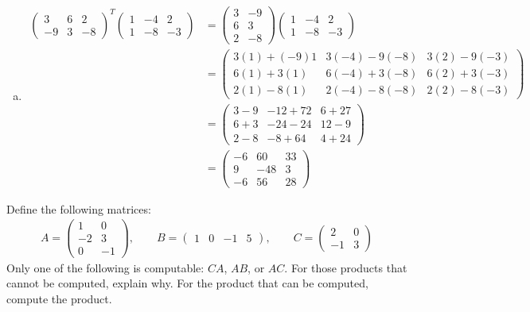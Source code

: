 \documentclass[11pt,letterpaper]{article}
\begin{document}
\begin{enumerate}[(a)]
\item 
	\[
	\begin{aligned}
	\begin{pmatrix} 3 & 6 & 2 \\ -9 & 3 & -8 \end{pmatrix}^T \begin{pmatrix} 1 & -4 & 2 \\ 1 & -8 & -3 \end{pmatrix}&= \begin{pmatrix} 3 & -9 \\ 6 & 3 \\ 2 & -8 \end{pmatrix} \begin{pmatrix} 1 & -4 & 2 \\ 1 & -8 & -3 \end{pmatrix} \\[0.3cm]
	&= \begin{pmatrix} 3(1) + (-9)1 & 3(-4) - 9(-8) & 3(2) - 9(-3) \\ 6(1) + 3(1) & 6(-4) + 3(-8) & 6(2) + 3(-3) \\ 2(1) - 8(1) & 2(-4) - 8(-8) & 2(2) - 8(-3) \end{pmatrix} \\[0.3cm]
	&= \begin{pmatrix} 3 - 9 & -12 + 72 & 6 + 27 \\ 6 + 3 & -24 - 24 & 12 - 9 \\ 2 - 8 & -8 + 64 & 4 + 24 \end{pmatrix} \\[0.3cm]
	&= \begin{pmatrix} -6 & 60 & 33 \\ 9 & -48 & 3 \\ -6 & 56 & 28 \end{pmatrix} 
	\end{aligned}
	\]
\end{enumerate}



\newpage



 Define the following matrices:
	\[
	\begin{aligned}
	A= \begin{pmatrix} 1 & 0 \\ -2 & 3 \\ 0 & -1 \end{pmatrix}, \qquad B= \begin{pmatrix} 1 & 0 & -1 & 5 \end{pmatrix}, \qquad C= \begin{pmatrix} 2 & 0 \\ -1 & 3 \end{pmatrix} 
	\end{aligned}
	\]
Only one of the following is computable: $CA$, $AB$, or $AC$. For those products that cannot be computed, explain why. For the product that can be computed, compute the product. \pspace
\end{document}
